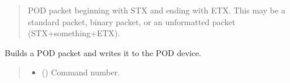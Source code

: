 \documentclass[letterpaper,10pt,english]{sphinxmanual}
\begin{document}
\begin{fulllineitems}
\begin{fulllineitems}
\begin{quote}
\begin{description}
\begin{itemize}
\end{itemize}

\sphinxAtStartPar
POD packet beginning with STX and ending with ETX. This may be a                 standard packet, binary packet, or an unformatted packet (STX+something+ETX).

\sphinxAtStartPar
{\hyperref[\detokenize{Morelia.Packets:Morelia.Packets.Packet.Packet}]{}}

\end{description}\end{quote}

\end{fulllineitems}


\begin{fulllineitems}
\label{\detokenize{Morelia.Devices:Morelia.Devices.PodDevice_8401HR.Pod8401HR.WritePacket}}
\pysigstartsignatures
{}
\pysigstopsignatures
\sphinxAtStartPar
Builds a POD packet and writes it to the POD device.
\begin{quote}\begin{description}
\begin{itemize}
\item {} 
\sphinxAtStartPar
{} (\sphinxstyleliteralemphasis{\sphinxupquote{ | }}) \textendash{} Command number.


\end{itemize}
\end{description}
\end{quote}
\end{fulllineitems}
\end{fulllineitems}
\end{document}
